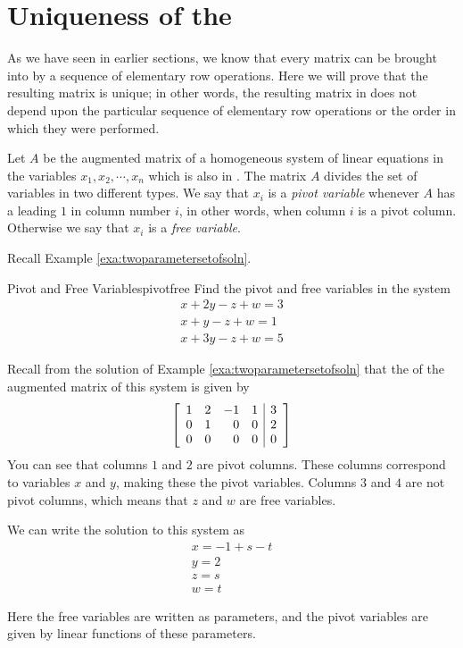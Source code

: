\section{Uniqueness of the {\RREF}}

As we have seen in earlier sections, we know that every matrix can be brought into {\rref} by a sequence of elementary row operations. Here we will prove that the resulting matrix is unique; in other words, the resulting matrix in {\rref} does not depend upon the particular sequence of elementary row operations or the order in which they were performed. 

Let $A$ be the augmented matrix of a homogeneous system of linear
equations in the variables $x_1, x_2, \cdots, x_n$ which is also in
{\rref}. The matrix $A$ divides the set of variables in two different
types. We say that $x_i$ is a {\em pivot variable} whenever $A$ has
a leading $1$ in column number $i$, in other words, when column $i$ is
a pivot column. Otherwise we say that $x_i$ is a {\em free
variable}.

Recall Example \ref{exa:twoparametersetofsoln}.

\begin{example}{Pivot and Free Variables}{pivotfree}
Find the pivot and free variables in the system
\[
\begin{array}{c}
x+2y-z+w=3 \\
x+y-z+w=1 \\
x+3y-z+w=5
\end{array}
\]
\end{example}

\begin{solution}
Recall from the solution of Example \ref{exa:twoparametersetofsoln} that the {\ef} of the augmented matrix of this system is given by
\[
\left[
\begin{array}{rrrr|r}
1 & 2 & -1 & 1 & 3 \\
0 & 1 & 0 & 0 & 2 \\
0 & 0 & 0 & 0 & 0
\end{array}
\right]  
\]
You can see that columns $1$ and $2$ are pivot columns. These columns correspond to variables $x$ and $y$, making these the pivot variables. Columns $3$ and $4$ are not pivot columns, which means that $z$ and $w$ are free variables.

We can write the solution to this system as 
\[
\begin{array}{c}
x=-1+s-t \\
y=2 \\
z=s \\
w=t
\end{array}
\]

Here the free variables are written as parameters, and the pivot variables are given by linear functions of these parameters. 
\end{solution}

